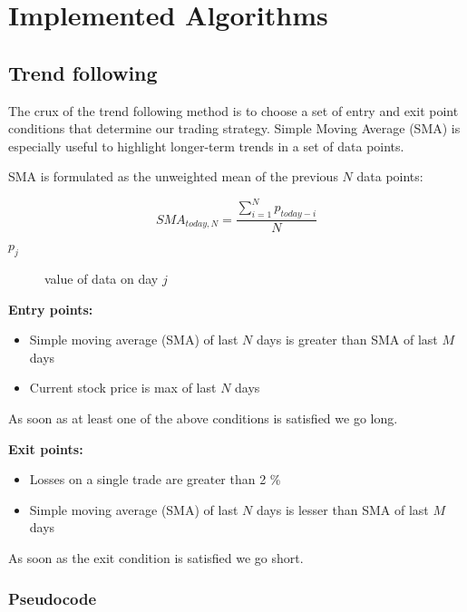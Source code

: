 \chapter{Implemented Algorithms}
\label{cha:implementedAlgorithms}



\section{Trend following}
\label{trend_following_impl}

The crux of the trend following method is to choose a set of entry and exit point conditions that determine our trading strategy.
Simple Moving Average (SMA) is especially useful to highlight longer-term trends in a set of data points.

SMA is formulated as the unweighted mean of the previous $N$ data points:

\begin{equation}
    SMA_{today,N} = \frac{\sum_{i=1}^{N}p_{today - i}}{N}
\end{equation}

\begin{description}
  \item [$p_{j}$] 
    value of data on day $j$
\end{description}


\textbf{Entry points:}
  \begin{itemize}
    \item Simple moving average (SMA) of last $N$ days is greater than SMA of last $M$ days
    \item Current stock price is max of last $N$ days
  \end{itemize}

As soon as at least one of the above conditions is satisfied we go long.


\textbf{Exit points:}
  \begin{itemize}
    \item Losses on a single trade are greater than 2 \% 
    \item Simple moving average (SMA) of last $N$ days is lesser than SMA of last $M$ days
  \end{itemize}

As soon as the exit condition is satisfied we go short.
 
\subsection{Pseudocode}


